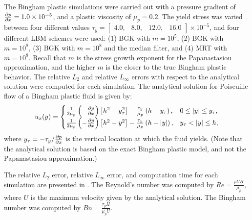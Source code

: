 The Bingham plastic simulations were carried out with a pressure gradient of $\frac{\partial p}{\partial x} = 1.0 \times 10^{-5}$, and a plastic viscosity of $\mu_p = 0.2$.
The yield stress was varied between four different values $\tau_y = \begin{bmatrix}4.0,&8.0,&12.0,&16.0\end{bmatrix} \times 10^{-5}$, and four different LBM schemes were used: (1) BGK with $m = 10^5$, (2) BGK with $m = 10^8$, (3) BGK with $m = 10^8$ and the median filter, and (4) MRT with $m = 10^8$. 
Recall that $m$ is the stress growth exponent for the Papanastasiou approximation, and the higher $m$ is the closer to the true Bingham plastic behavior.
The relative $L_2$ and relative $L_{\infty}$ errors with respect to the analytical solution were computed for each simulation.
The analytical solution for Poiseuille flow of a Bingham plastic fluid is given by:
\begin{equation} \label{eq:analytical-bingham}
u_x(y) = \begin{cases}
\frac{1}{2 \mu_p} \left(-\frac{\partial p}{\partial x}\right) \left[h^2 - y_{\tau}^2 \right] - \frac{\tau_y}{\mu_p} \left(h - y_{\tau}\right), & 0 \leq |y| \leq y_{\tau}, \\
\frac{1}{2 \mu_p} \left(-\frac{\partial p}{\partial x}\right) \left[h^2 - y^2 \right] - \frac{\tau_y}{\mu_p} \left(h - |y|\right), & y_{\tau} < |y| \leq h,
\end{cases}
\end{equation}
\noindent where $y_{\tau} = -\tau_y / \frac{\partial p}{\partial x}$ is the vertical location at which the fluid yields.
(Note that the analytical solution is based on the exact Bingham plastic model, and not the Papanastasiou approximation.)

The relative $L_2$ error, relative $L_{\infty}$ error, and computation time for each simulation are presented in .
The Reynold's number was computed by $Re = \frac{\rho U H}{\mu_p}$, where $U$ is the maximum velocity given by the analytical solution.
The Bingham number was computed by $Bn = \frac{\tau_y H}{\mu_p U}$.



